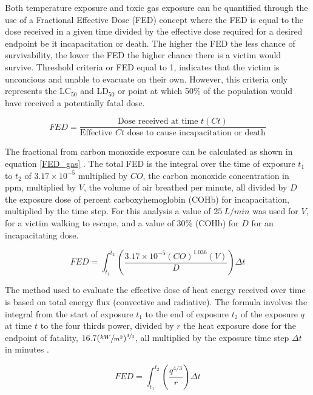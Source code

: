 \documentclass[12pt,oneside]{book}
\begin{document}
Both temperature exposure and toxic gas exposure can be quantified through the use of a Fractional Effective Dose (FED) concept where the FED is equal to the dose received in a given time divided by the effective dose required for a desired endpoint be it incapacitation or death. The higher the FED the less chance of survivability, the lower the FED the higher chance there is a victim would survive. Threshold criteria or FED equal to 1, indicates that the victim is unconcious and unable to evacuate on their own. However, this criteria only represents the LC$_{50}$ and LD$_{50}$ or point at which 50\% of the population would have received a potentially fatal dose.

\begin{equation}
	FED = \frac{\text{Dose received at time } t(Ct)}{\text{Effective } Ct \text{ dose to cause incapacitation or death}}
	\label{FED_general}
\end{equation} 

The fractional from carbon monoxide exposure can be calculated as shown in equation \ref{FED_gas} \cite{SFPE:Purser}. The total FED is the integral over the time of exposure $t_1$ to $t_2$ of $3.17 \times  10^{-5}$ multiplied by $CO$, the carbon monoxide concentration in ppm, multiplied by $V$, the volume of air breathed per minute, all divided by $D$ the exposure dose of percent carboxyhemoglobin (COHb) for incapacitation, multiplied by the time step. For this analysis a value of $25~L/min$ was used for $V$, for a victim walking to escape, and a value of 30\% (COHb) for $D$ for an incapacitating dose.

\begin{equation}
	FED = \int_{t_1}^{t_2}\left(\frac{3.17 \times 10^{-5} \left(CO\right)^{1.036} \left(V\right)}{D}\right) \Delta t
	\label{FED_gas}
\end{equation}

The method used to evaluate the effective dose of heat energy received over time is based on total energy flux (convective and radiative). The formula involves the integral from the start of exposure $t_1$ to the end of exposure $t_2$ of the exposure $q$ at time $t$ to the four thirds power, divided by $r$ the heat exposure dose for the endpoint of fatality, $16.7(\sfrac{kW}{m^2})^{\sfrac{4}{3}}$, all multiplied by the exposure time step $\Delta t$ in minutes \cite{SFPE:Purser}.

\begin{equation} \label{TotalFlux_FED}
	FED = \int_{t_1}^{t_2} \left( \frac{q^{4/3}}{r} \right) \Delta t
\end{equation}
\end{document}
